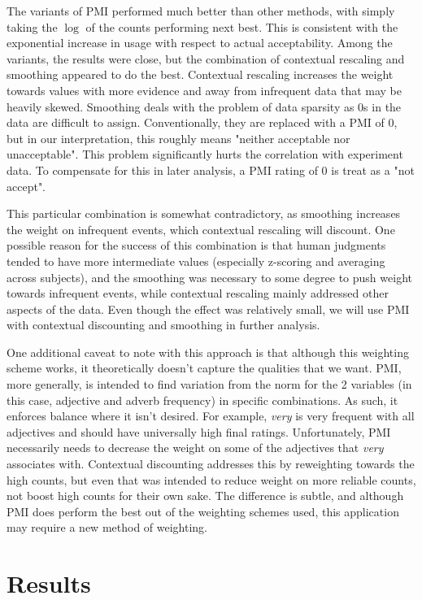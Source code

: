 \documentclass[11pt]{article}
\begin{document}
The variants of PMI performed much better than other methods, with simply taking the $\log$ of the counts performing next best. This is consistent with the exponential increase in usage with respect to actual acceptability. Among the variants, the results were close, but the combination of contextual rescaling and smoothing appeared to do the best. Contextual rescaling increases the weight towards values with more evidence and away from infrequent data that may be heavily skewed. Smoothing deals with the problem of data sparsity as 0s in the data are difficult to assign. Conventionally, they are replaced with a PMI of 0, but in our interpretation, this roughly means "neither acceptable nor unacceptable". This problem significantly hurts the correlation with experiment data. To compensate for this in later analysis, a PMI rating of 0 is treat as a "not accept".

This particular combination is somewhat contradictory, as smoothing increases the weight on infrequent events, which contextual rescaling will discount. One possible reason for the success of this combination is that human judgments tended to have more intermediate values (especially z-scoring and averaging across subjects), and the smoothing was necessary to some degree to push weight towards infrequent events, while contextual rescaling mainly addressed other aspects of the data. Even though the effect was relatively small, we will use PMI with contextual discounting and smoothing in further analysis.

One additional caveat to note with this approach is that although this weighting scheme works, it theoretically doesn't capture the qualities that we want. PMI, more generally, is intended to find variation from the norm for the 2 variables (in this case, adjective and adverb frequency) in specific combinations. As such, it enforces balance where it isn't desired. For example, \textit{very} is very frequent with all adjectives and should have universally high final ratings. Unfortunately, PMI necessarily needs to decrease the weight on some of the adjectives that \textit{very} associates with. Contextual discounting addresses this by reweighting towards the high counts, but even that was intended to reduce weight on more reliable counts, not boost high counts for their own sake. The difference is subtle, and although PMI does perform the best out of the weighting schemes used, this application may require a new method of weighting.

\section{Results}
\end{document}
